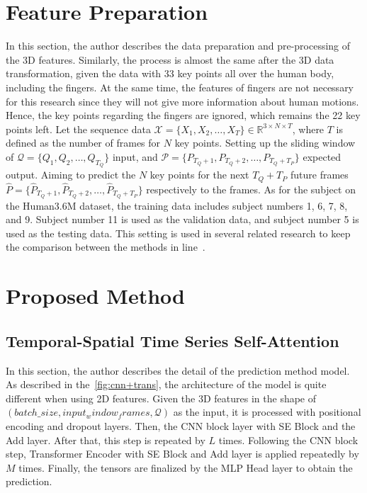 \section{Feature Preparation}\label{4:3Dfeaturepreparation}
In this section, the author describes the data preparation and pre-processing of the 3D features.
Similarly, the process is almost the same after the 3D data transformation, given the data with 33 key points all over the human body, including the fingers. At the same time, the features of fingers are not necessary for this research since they will not give more information about human motions. Hence, the key points regarding the fingers are ignored, which remains the 22 key points left. 
Let the sequence data $\mathcal{X} = \{ X_1, X_2, \ldots ,X_T \} \in \mathbb{R}^{3 \times N \times T}$, where $T$ is defined as the number of frames for $N$ key points. 
Setting up the sliding window of $\mathcal{Q} = \{ Q_1, Q_2, \ldots ,Q_{T_Q} \}$ input, and $\mathcal{P} = \{ P_{T_{Q}+1}, P_{T_{Q}+2}, \ldots ,P_{T_Q + T_P} \}$ expected output.
Aiming to predict the $N$ key points for the next $T_Q + T_P$ future frames $\hat{P} = \{ \hat{P}_{T_{Q}+1}, \hat{P}_{T_{Q}+2}, \ldots ,\hat{P}_{T_Q + T_P} \}$ respectively to the frames. As for the subject on the Human3.6M dataset, the training data includes subject numbers 1, 6, 7, 8, and 9. Subject number 11 is used as the validation data, and subject number 5 is used as the testing data. This setting is used in several related research to keep the comparison between the methods in line~\cite{Sofianos2021, motionmixer2022}. 

\section{Proposed Method}\label{4:method}
\subsection{Temporal-Spatial Time Series Self-Attention}\label{4:tssa}
In this section, the author describes the detail of the prediction method model. As described in the~\ref{fig:cnn+trans}, the architecture of the model is quite different when using 2D features. Given the 3D features in the shape of $(batch\_size, input_window_frames, \mathcal{Q})$ as the input, it is processed with positional encoding and dropout layers. 
Then, the CNN block layer with SE Block and the Add layer. 
After that, this step is repeated by $L$ times. 
Following the CNN block step, Transformer Encoder with SE Block and Add layer is applied repeatedly by $M$ times. Finally, the tensors are finalized by the MLP Head layer to obtain the prediction. 

